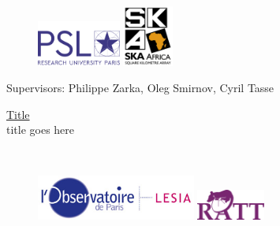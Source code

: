 
\begin{figure}[h]
\centering
\begin{minipage}{.45\textwidth}
\centering
\includegraphics[height=1.5cm]{titlepage/logo-psl.png}
\end{minipage}
\begin{minipage}{.45\textwidth}
\centering
\includegraphics[height=2.0cm]{titlepage/ska-logo.jpg}
\end{minipage}
\end{figure}
\vspace{1cm}
{\let\newpage\relax\maketitle}
\maketitle
\begin{center}
\Large{Supervisors: Philippe Zarka, Oleg Smirnov, Cyril Tasse}
\end{center}
\noindent\Hrule
\begin{center}
\Large{\underline{Title}}\\
\pg
title goes here
\end{center}
%
~\\
\Hrule
\vspace{2.5cm}
\begin{figure}[h]
\centering
\begin{minipage}{.45\textwidth}
\centering
\includegraphics[height=1.5cm]{titlepage/LogoLESIA.jpg}
\end{minipage}
\begin{minipage}{.45\textwidth}
\centering
\includegraphics[height=1.0cm]{titlepage/ratt-logo.png}
\end{minipage}
\end{figure}
\thispagestyle{empty}
\restoregeometry


\newpage
\setcounter{page}{1}
\tableofcontents

\newpage